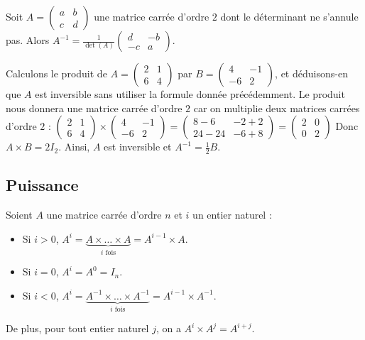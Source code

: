 	\begin{formula}
		Soit $\displaystyle{A = \begin{pmatrix} a & b \\ c & d \end{pmatrix}}$ une matrice carrée d'ordre $2$ dont le déterminant ne s'annule pas.
		\newpar
		Alors $\displaystyle{A^{-1} = \frac{1}{\det(A)} \begin{pmatrix} d & -b \\ -c & a \end{pmatrix}}$.
	\end{formula}
	
	\begin{tip}[Exemple]
		Calculons le produit de $\displaystyle{A = \begin{pmatrix}2 & 1 \\ 6 & 4\end{pmatrix}}$ par $\displaystyle{B = \begin{pmatrix}4 & -1 \\ -6 & 2\end{pmatrix}}$, et déduisons-en que $A$ est inversible sans utiliser la formule donnée précédemment.
		\newpar
		Le produit nous donnera une matrice carrée d'ordre $2$ car on multiplie deux matrices carrées d'ordre $2$ :
		\newpar
		$\displaystyle{\begin{pmatrix} 2 & 1 \\ 6 & 4 \end{pmatrix} \times \begin{pmatrix} 4 & -1 \\ -6 & 2\end{pmatrix} = \begin{pmatrix}8-6 & -2+2 \\ 24-24 & -6+8 \end{pmatrix} = \begin{pmatrix} 2 & 0 \\ 0 & 2 \end{pmatrix}}$
		\newpar
		Donc $A \times B = 2I_2$. Ainsi, $A$ est inversible et $A^{-1} = \frac{1}{2} B$.
	\end{tip}
	
	\subsection{Puissance}
	
	\begin{formula}
		Soient $A$ une matrice carrée d'ordre $n$ et $i$ un entier naturel :
		\begin{itemize}
			\item Si $i > 0$, $\displaystyle{A^i = \underbrace{A \times \dots \times A}_{i \text{ fois}} = A^{i-1} \times A}$.
			\item Si $i = 0$, $A^i = A^0 = I_n$.
			\item Si $i < 0$, $\displaystyle{A^i = \underbrace{A^{-1} \times \dots \times A^{-1}}_{i \text{ fois}} = A^{i-1} \times A^{-1}}$.
		\end{itemize}
		De plus, pour tout entier naturel $j$, on a $A^i \times A^j = A^{i+j}$.
	\end{formula}
	
